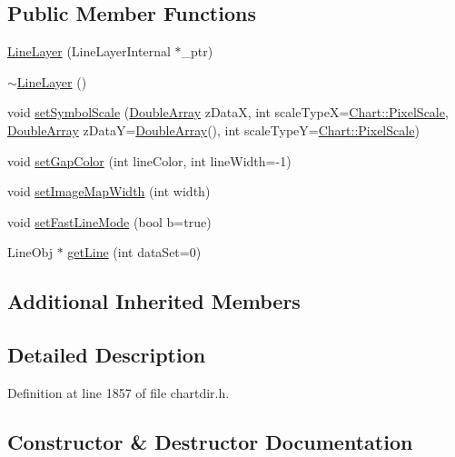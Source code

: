 \subsection*{Public Member Functions}
\begin{DoxyCompactItemize}
\item 
\hyperlink{class_line_layer_afd36bb73a17ffd6a3656303920caa096}{Line\+Layer} (Line\+Layer\+Internal $\ast$\+\_\+ptr)
\item 
\hyperlink{class_line_layer_a7501e67eff71d5c352e2bb3ab10e189f}{$\sim$\+Line\+Layer} ()
\item 
void \hyperlink{class_line_layer_a895f509de10c66189649d10872db77ab}{set\+Symbol\+Scale} (\hyperlink{class_double_array}{Double\+Array} z\+DataX, int scale\+TypeX=\hyperlink{namespace_chart_af8005281e1fb57d737e9f89b13605808afebebf69a28e58958dc5f9da3ece2147}{Chart\+::\+Pixel\+Scale}, \hyperlink{class_double_array}{Double\+Array} z\+DataY=\hyperlink{class_double_array}{Double\+Array}(), int scale\+TypeY=\hyperlink{namespace_chart_af8005281e1fb57d737e9f89b13605808afebebf69a28e58958dc5f9da3ece2147}{Chart\+::\+Pixel\+Scale})
\item 
void \hyperlink{class_line_layer_afe09d8e4799b6428811db89d08ee456b}{set\+Gap\+Color} (int line\+Color, int line\+Width=-\/1)
\item 
void \hyperlink{class_line_layer_a64657daacc236f5f74b9f91edf70a6bd}{set\+Image\+Map\+Width} (int width)
\item 
void \hyperlink{class_line_layer_a8554fc14eee73c52ad9bc0ecfe753531}{set\+Fast\+Line\+Mode} (bool b=true)
\item 
Line\+Obj $\ast$ \hyperlink{class_line_layer_a478b1ce70dc1ddc37f675ab8d2a158fc}{get\+Line} (int data\+Set=0)
\end{DoxyCompactItemize}
\subsection*{Additional Inherited Members}


\subsection{Detailed Description}


Definition at line 1857 of file chartdir.\+h.



\subsection{Constructor \& Destructor Documentation}
\mbox{\label{class_line_layer_afd36bb73a17ffd6a3656303920caa096}} 
